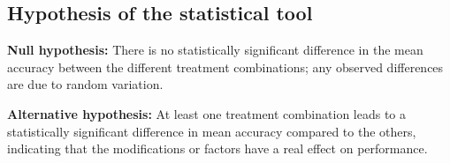 \subsection{Hypothesis of the statistical tool}

\textbf{Null hypothesis:} There is no statistically significant difference in the mean accuracy between the different treatment combinations; any observed differences are due to random variation.

\textbf{Alternative hypothesis:} At least one treatment combination leads to a statistically significant difference in mean accuracy compared to the others, indicating that the modifications or factors have a real effect on performance.
